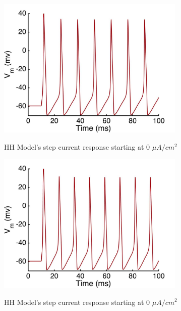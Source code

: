 \documentclass{beamer}
\begin{document}
\begin{frame}
  \begin{figure}
    \centering
    \includegraphics[width = 0.8\textwidth]{./images/current_0_15.jpg}

    HH Model's step current response starting at 0 $\mu A/cm^2$
  \end{figure}
\end{frame}


\begin{frame}
  \begin{figure}
    \centering
    \includegraphics[width = 0.8\textwidth]{./images/current_0_20.jpg}

    HH Model's step current response starting at 0 $\mu A/cm^2$
  \end{figure}
\end{frame}
\end{document}

